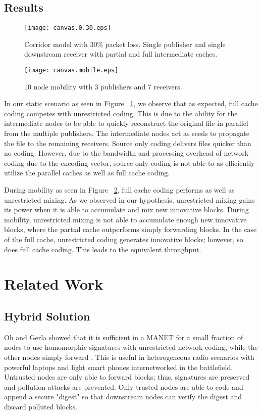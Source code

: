 \subsection{Results}

\begin{figure}[t]
\texttt{[image: canvas.0.30.eps]}
\caption{Corridor model with 30\% packet loss. Single publisher and single downstream receiver with partial and full intermediate caches.}
\label{fig:static}
\end{figure}

\begin{figure}[t]
\texttt{[image: canvas.mobile.eps]}
\caption{10 node mobility with 3 publishers and 7 receivers.}
\label{fig:mobile}
\end{figure}




In our static scenario as seen in Figure ~\ref{fig:static}, we observe that as expected, full cache coding competes with unrestricted coding. This is due to the ability for the intermediate nodes to be able to quickly reconstruct the original file in parallel from the multiple publishers. The intermediate nodes act as seeds to propagate the file to the remaining receivers. Source only coding delivers files quicker than no coding. However, due to the bandwidth and processing overhead of network coding due to the encoding vector, source only coding is not able to as efficiently utilize the parallel caches as well as full cache coding.

During mobility as seen in Figure ~\ref{fig:mobile}, full cache coding performs as well as unrestricted mixing. As we observed in our hypothesis, unrestricted mixing gains its power when it is able to accumulate and mix new innovative blocks. During mobility, unrestricted mixing is not able to accumulate enough new innovative blocks, where the partial cache outperforms simply forwarding blocks. In the case of the full cache, unrestricted coding generates innovative blocks; however, so does full cache coding. This leads to the equivalent throughput.

\section{Related Work}

\subsection{Hybrid Solution}
Oh and Gerla showed that it is sufficient in a MANET for a small fraction of nodes to use homomorphic signatures with unrestricted network coding, while the other nodes simply forward \cite{5437114}. This is useful in heterogeneous radio scenarios with powerful laptops and light smart phones internetworked in the battlefield. Untrusted nodes are only able to forward blocks; thus, signatures are preserved and pollution attacks are prevented. Only trusted nodes are able to code and append a secure "digest" so that downstream nodes can verify the digest and discard polluted blocks.


